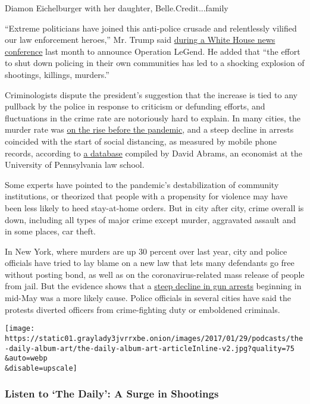 Diamon Eichelburger with her daughter, Belle.Credit...family

``Extreme politicians have joined this anti-police crusade and
relentlessly vilified our law enforcement heroes,'' Mr. Trump said
\href{https://www.whitehouse.gov/briefings-statements/remarks-president-trump-operation-legend-combatting-violent-crime-american-cities/}{during
a White House news conference} last month to announce Operation LeGend.
He added that ``the effort to shut down policing in their own
communities has led to a shocking explosion of shootings, killings,
murders.''

Criminologists dispute the president's suggestion that the increase is
tied to any pullback by the police in response to criticism or defunding
efforts, and fluctuations in the crime rate are notoriously hard to
explain. In many cities, the murder rate was
\href{https://www.nytimes3xbfgragh.onion/2020/07/06/upshot/murders-rising-crime-coronavirus.html}{on
the rise before the pandemic}, and a steep decline in arrests coincided
with the start of social distancing, as measured by mobile phone
records, according to \href{https://citycrimestats.com/covid/}{a
database} compiled by David Abrams, an economist at the University of
Pennsylvania law school.

Some experts have pointed to the pandemic's destabilization of community
institutions, or theorized that people with a propensity for violence
may have been less likely to heed stay-at-home orders. But in city after
city, crime overall is down, including all types of major crime except
murder, aggravated assault and in some places, car theft.

In New York, where murders are up 30 percent over last year, city and
police officials have tried to lay blame on a new law that lets many
defendants go free without posting bond, as well as on the
coronavirus-related mass release of people from jail. But the evidence
shows that a
\href{https://www.nytimes3xbfgragh.onion/2020/08/04/nyregion/nyc-shootings-coronavirus.html?searchResultPosition=2}{steep
decline in gun arrests} beginning in mid-May was a more likely cause.
Police officials in several cities have said the protests diverted
officers from crime-fighting duty or emboldened criminals.

\texttt{[image: https://static01.graylady3jvrrxbe.onion/images/2017/01/29/podcasts/the-daily-album-art/the-daily-album-art-articleInline-v2.jpg?quality=75\\\&auto=webp\\\&disable=upscale]}

\hypertarget{listen-to-the-daily-a-surge-in-shootings}{%
\subsubsection{Listen to `The Daily': A Surge in
Shootings}\label{listen-to-the-daily-a-surge-in-shootings}}

